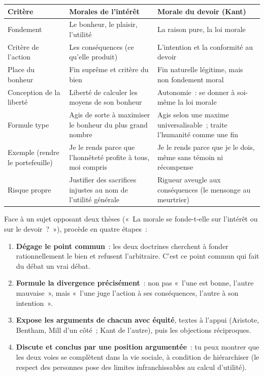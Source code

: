\documentclass[11pt]{article}
\newcounter{popsec}
\newcounter{popsub}
\newcommand{\courssub}[1]{%
  \stepcounter{popsub}%
  \par\vspace{9pt}\noindent{\popxbold\fontsize{11.5}{13}\selectfont\color{popink}{\color{poporange}\thepopsec.\thepopsub}\hspace{6pt}#1}\par\nopagebreak\vspace{4pt}
}
\begin{document}
\courssub{Tableau comparatif des deux voies}

\begin{center}
\begin{tabularx}{\linewidth}{|l|X|X|}
\hline
\rowcolor{popblueL} \textbf{Critère} & \textbf{Morales de l'intérêt} & \textbf{Morale du devoir (Kant)} \\
\hline
Fondement & Le bonheur, le plaisir, l'utilité & La raison pure, la loi morale \\
\hline
Critère de l'action & Les conséquences (ce qu'elle produit) & L'intention et la conformité au devoir \\
\hline
Place du bonheur & Fin suprême et critère du bien & Fin naturelle légitime, mais non fondement moral \\
\hline
Conception de la liberté & Liberté de calculer les moyens de son bonheur & Autonomie~: se donner à soi-même la loi morale \\
\hline
Formule type & Agis de sorte à maximiser le bonheur du plus grand nombre & Agis selon une maxime universalisable~; traite l'humanité comme une fin \\
\hline
Exemple (rendre le portefeuille) & Je le rends parce que l'honnêteté profite à tous, moi compris & Je le rends parce que je le dois, même sans témoin ni récompense \\
\hline
Risque propre & Justifier des sacrifices injustes au nom de l'utilité générale & Rigueur aveugle aux conséquences (le mensonge au meurtrier) \\
\hline
\end{tabularx}
\end{center}

\begin{methode}
Face à un sujet opposant deux thèses («~La morale se fonde-t-elle sur l'intérêt ou sur le devoir~?~»), procède en quatre étapes~:
\begin{enumerate}
\item \textbf{Dégage le point commun}~: les deux doctrines cherchent à fonder rationnellement le bien et refusent l'arbitraire. C'est ce point commun qui fait du débat un vrai débat.
\item \textbf{Formule la divergence précisément}~: non pas «~l'une est bonne, l'autre mauvaise~», mais «~l'une juge l'action à ses conséquences, l'autre à son intention~».
\item \textbf{Expose les arguments de chacun avec équité}, textes à l'appui (Aristote, Bentham, Mill d'un côté~; Kant de l'autre), puis les objections réciproques.
\item \textbf{Discute et conclus par une position argumentée}~: tu peux montrer que les deux voies se complètent dans la vie sociale, à condition de hiérarchiser (le respect des personnes pose des limites infranchissables au calcul d'utilité).
\end{enumerate}
\end{methode}
\end{document}

